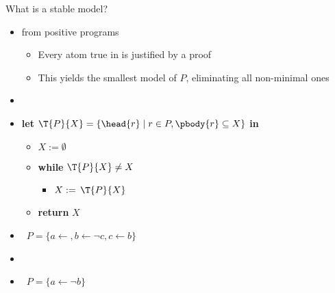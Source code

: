 \begin{frame}{What is a stable model?}
  \begin{itemize}
  \item {} from positive programs
    \begin{itemize}
    \item Every atom true in  is justified by a proof
    \item This yields the smallest model of $P$, eliminating all non-minimal ones
    \end{itemize}
  \item {}
      \item [] \textbf{let} $\T{P}{X}=\{\head{r}\mid r\in P, \pbody{r}\subseteq X\}$ \textbf{in}
    \begin{itemize}\normalsize
    \item []$X := \emptyset$
      \smallskip
    \item []\textbf{while} {$\T{P}{X}\neq X$}
      \begin{itemize}\normalsize
      \item[] $X := {\,\T{P}{X}}$
      \end{itemize}
    \item[] \textbf{return} $X$
    \end{itemize}
    \item {} \
      $P=\{a\leftarrow{},b\leftarrow \neg c,c\leftarrow b\}$

  \item {}
  \item {} \
          $P=\{a\leftarrow\neg b\}$

  \end{itemize}
\end{frame}
